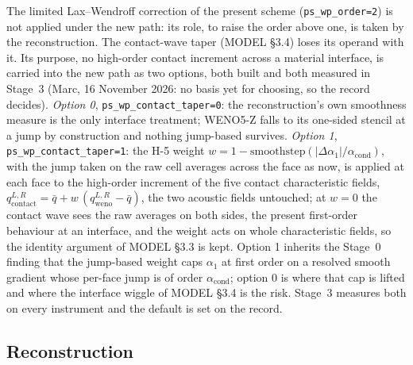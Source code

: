 \documentclass[11pt,a4paper]{article}
\newcommand{\code}[1]{\texttt{\small #1}}
\begin{document}
The limited Lax--Wendroff correction of the present scheme
(\code{ps\_wp\_order=2}) is not applied under the new path: its role, to
raise the order above one, is taken by the reconstruction.  The
contact-wave taper (MODEL \S3.4) loses its operand with it.  Its purpose,
no high-order contact increment across a material interface, is carried
into the new path as two options, both built and both measured in
Stage~3 (Marc, 16 November 2026: no basis yet for choosing, so the
record decides).  \emph{Option 0}, \code{ps\_wp\_contact\_taper=0}: the
reconstruction's own smoothness measure is the only interface treatment;
WENO5-Z falls to its one-sided stencil at a jump by construction and
nothing jump-based survives.  \emph{Option 1},
\code{ps\_wp\_contact\_taper=1}: the H-5 weight
$w = 1 - \mathrm{smoothstep}(|\Delta\alpha_1|/\alpha_{\mathrm{cond}})$,
with the jump taken on the raw cell averages across the face as now, is
applied at each face to the high-order increment of the five contact
characteristic fields, $q^{L,R}_{\mathrm{contact}} = \bar q + w\,(q^{L,R}_{\mathrm{weno}} - \bar q)$,
the two acoustic fields untouched; at $w = 0$ the contact wave sees the
raw averages on both sides, the present first-order behaviour at an
interface, and the weight acts on whole characteristic fields, so the
identity argument of MODEL \S3.3 is kept.  Option 1 inherits the Stage~0
finding that the jump-based weight caps $\alpha_1$ at first order on a
resolved smooth gradient whose per-face jump is of order
$\alpha_{\mathrm{cond}}$; option 0 is where that cap is lifted and where
the interface wiggle of MODEL \S3.4 is the risk.  Stage~3 measures both
on every instrument and the default is set on the record.

\subsection{Reconstruction}
\end{document}
